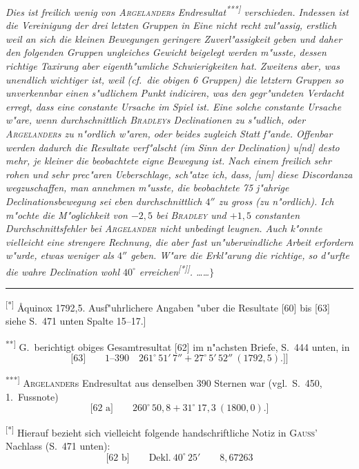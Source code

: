 \documentclass[12pt,a4paper]{article}
\theoremstyle{plain}
\theoremstyle{definition}
\theoremstyle{remark}
\begin{document}
{{\itshape Dies ist freilich wenig von \textsc{Argelander}s Endresultat\textsuperscript{***]} verschieden. Indessen ist die Vereinigung der drei letzten Gruppen in Eine nicht recht zul"assig, erstlich weil an sich die kleinen Bewegungen geringere Zuverl"assigkeit geben und daher den folgenden Gruppen ungleiches Gewicht beigelegt werden m"usste, dessen richtige Taxirung aber eigenth"umliche Schwierigkeiten hat. Zweitens aber, was unendlich wichtiger ist, weil (cf.\ die obigen 6 Gruppen) die letztern Gruppen so unverkennbar einen s"udlichem Punkt indiciren, was den gegr"undeten Verdacht erregt, dass eine {\itshape constante} Ursache im Spiel ist. Eine solche constante Ursache w"are, wenn durchschnittlich \textsc{Bradley}s Declinationen zu s"udlich, oder \textsc{Argelander}s zu n"ordlich w"aren, oder beides zugleich Statt f"ande. Offenbar werden dadurch die Resultate verf"alscht (im Sinn der Declination) u[nd] desto mehr, je kleiner die beobachtete eigne Bewegung ist. Nach einem freilich sehr rohen und sehr prec"aren Ueberschlage, sch"atze ich, dass, [um] diese Discordanza wegzuschaffen, man annehmen m"usste, die beobachtete 75 j"ahrige Declinationsbewegung sei eben durchschnittlich $4''$ zu gross (zu n"ordlich). Ich m"ochte die M"oglichkeit von $-2{,}5$ bei \textsc{Bradley} und $+1{,}5$ constanten Durchschnittsfehler bei \textsc{Argelander} nicht unbedingt leugnen. Auch k"onnte vielleicht eine strengere Rechnung, die aber fast un"uberwindliche Arbeit erfordern w"urde, etwas weniger als $4''$ geben. W"are die Erkl"arung die richtige, so d"urfte die wahre Declination wohl $40^{\circ}$ erreichen\textsuperscript{[*]]}. \ldots{}\ldots{}$\}$}

\rule{\textwidth}{0.4pt}
{\small
\textsuperscript{[*]} \AA{}quinox 1792,5. Ausf"uhrlichere Angaben "uber die Resultate [60] bis [63] siehe S.\ 471 unten Spalte 15--17.]

\textsuperscript{**]} G.\ berichtigt obiges Gesamtresultat [62] im n"achsten Briefe, S.\ 444 unten, in
\[
\text{[63]}\qquad 1\text{--}390 \quad 261^{\circ}\,51'\,7'' + 27^{\circ}\,5'\,52''\ (1792{,}5).\text{]}]
\]

\textsuperscript{***]} \textsc{Argelander}s Endresultat aus denselben 390 Sternen war (vgl.\ S.\ 450, 1.\ Fussnote)
\[
\text{[62 a]}\qquad 260^{\circ}\,50{,}8 + 31^{\circ}\,17{,}3\ (1800{,}0).\text{]}
\]

\textsuperscript{[*]} Hierauf bezieht sich vielleicht folgende handschriftliche Notiz in \textsc{Gauss}' Nachlass (S.\ 471 unten):
\[
\text{[62 b]}\qquad \text{Dekl.}\ 40^{\circ}\,25' \qquad 8{,}67263
\]

}}
\end{document}
